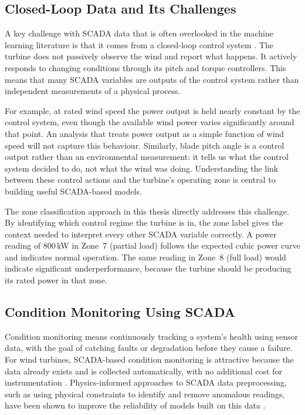\subsection{Closed-Loop Data and Its Challenges}
\label{subsec:bg:scada:closedloop}

A key challenge with SCADA data that is often overlooked in the machine learning
literature is that it comes from a closed-loop control system \citep{indrekvam2026}. The turbine does not
passively observe the wind and report what happens. It actively responds to changing
conditions through its pitch and torque controllers. This means that many SCADA variables
are outputs of the control system rather than independent measurements of a physical
process.

For example, at rated wind speed the power output is held nearly constant by the control
system, even though the available wind power varies significantly around that point. An
analysis that treats power output as a simple function of wind speed will not capture
this behaviour. Similarly, blade pitch angle is a control output rather than an
environmental measurement: it tells us what the control system decided to do, not what
the wind was doing. Understanding the link between these control actions and the
turbine's operating zone is central to building useful SCADA-based models.

The zone classification approach in this thesis directly addresses this challenge. By
identifying which control regime the turbine is in, the zone label gives the context
needed to interpret every other SCADA variable correctly. A power reading of 800\,kW in
Zone~7 (partial load) follows the expected cubic power curve and indicates normal
operation. The same reading in Zone~8 (full load) would indicate significant
underperformance, because the turbine should be producing its rated power in that zone.

\subsection{Condition Monitoring Using SCADA}
\label{subsec:bg:scada:cm}

Condition monitoring means continuously tracking a system's health using sensor data,
with the goal of catching faults or degradation before they cause a failure. For wind
turbines, SCADA-based condition monitoring is attractive because the data already exists
and is collected automatically, with no additional cost for instrumentation \citep{pandit2019}.
Physics-informed approaches to SCADA data preprocessing, such as using physical
constraints to identify and remove anomalous readings, have been shown to improve the
reliability of models built on this data \citep{hong2025}.

